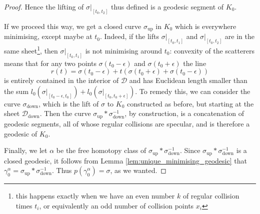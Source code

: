 \documentclass[10pt,a4paper]{amsart}
\begin{document}
\begin{proof}
    Hence the lifting of \( \sigma\rvert_{[t_0, t_2]} \) thus defined is a geodesic segment of \( K_0 \).
    \par If we proceed this way, we get a closed curve \( \sigma_\mathrm{up} \) in \(K_0 \) which is everywhere minimising, except maybe at \( t_0 \).
    Indeed, if the lifts \( \sigma\rvert_{[t_0, t_1]} \) and \( \sigma\rvert_{[t_0, t_2]} \) are in the same sheet\footnote{
        this happens exactly when we have an even number \( k \) of regular collision times \( t_i \), or equivalently an odd number of collision points \( x_i \)
    },
    then \( \sigma\rvert_{[t_k, t_1]} \) is not minimising around \( t_0 \):
    convexity of the scatterers means that for any two points \( \sigma(t_0-\epsilon) \) and \( \sigma(t_0 + \epsilon) \) the line
    \[
        r(t) = \sigma(t_0-\epsilon) + t(\sigma(t_0+\epsilon) + \sigma(t_0-\epsilon)) 
    \]
    is entirely contained in the interior of \( \mathcal{D} \) and has Euclidean length smaller than the sum \( l_0(\sigma\rvert_{[t_0-\epsilon, t_0]}) + l_0(\sigma\rvert_{[t_0, t_0+\epsilon]}) \).
    To remedy this, we can consider the curve \( \sigma_\mathrm{down} \), which is the lift of \( \sigma \) to \( K_0 \) constructed as before, but starting at the sheet \( \mathcal{D}_\mathrm{down} \).
    Then the curve \( \sigma_\mathrm{up}\ast\sigma_\mathrm{down}^{-1} \), by construction, is a concatenation of geodesic segments, all of whose regular collisions are specular, and is therefore a geodesic of \( K_0 \).
    \par Finally, we let \( \alpha \) be the free homotopy class of \( \sigma_\mathrm{up}\ast\sigma_\mathrm{down}^{-1} \). 
    Since \( \sigma_\mathrm{up}\ast\sigma_\mathrm{down}^{-1} \) is a closed geodesic, it follows from Lemma \ref{lem:unique_minimising_geodesic} that \(\gamma^\alpha_0 = \sigma_\mathrm{up}\ast\sigma_\mathrm{down}^{-1} \).
    Thus \(p(\gamma^\alpha_0) = \sigma \), as we wanted.  
\end{proof}
\end{document}
